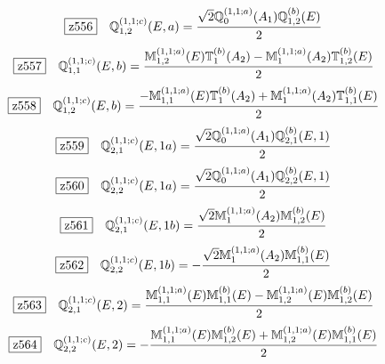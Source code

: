\documentclass[fleqn,10pt,landscape]{jsarticle}
\begin{document}
\begin{dmath*}
\hspace*{3mm}\fbox{z556}\quad \mathbb{Q}_{1,2}^{(1,1;c)}(E,a)=\frac{\sqrt{2} \mathbb{Q}_{0}^{(1,1;a)}(A_{1}) \mathbb{Q}_{1,2}^{(b)}(E)}{2}
\end{dmath*}
\begin{dmath*}
\hspace*{3mm}\fbox{z557}\quad \mathbb{Q}_{1,1}^{(1,1;c)}(E,b)=\frac{\mathbb{M}_{1,2}^{(1,1;a)}(E) \mathbb{T}_{1}^{(b)}(A_{2}) - \mathbb{M}_{1}^{(1,1;a)}(A_{2}) \mathbb{T}_{1,2}^{(b)}(E)}{2}
\end{dmath*}
\begin{dmath*}
\hspace*{3mm}\fbox{z558}\quad \mathbb{Q}_{1,2}^{(1,1;c)}(E,b)=\frac{- \mathbb{M}_{1,1}^{(1,1;a)}(E) \mathbb{T}_{1}^{(b)}(A_{2}) + \mathbb{M}_{1}^{(1,1;a)}(A_{2}) \mathbb{T}_{1,1}^{(b)}(E)}{2}
\end{dmath*}
\begin{dmath*}
\hspace*{3mm}\fbox{z559}\quad \mathbb{Q}_{2,1}^{(1,1;c)}(E,1a)=\frac{\sqrt{2} \mathbb{Q}_{0}^{(1,1;a)}(A_{1}) \mathbb{Q}_{2,1}^{(b)}(E,1)}{2}
\end{dmath*}
\begin{dmath*}
\hspace*{3mm}\fbox{z560}\quad \mathbb{Q}_{2,2}^{(1,1;c)}(E,1a)=\frac{\sqrt{2} \mathbb{Q}_{0}^{(1,1;a)}(A_{1}) \mathbb{Q}_{2,2}^{(b)}(E,1)}{2}
\end{dmath*}
\begin{dmath*}
\hspace*{3mm}\fbox{z561}\quad \mathbb{Q}_{2,1}^{(1,1;c)}(E,1b)=\frac{\sqrt{2} \mathbb{M}_{1}^{(1,1;a)}(A_{2}) \mathbb{M}_{1,2}^{(b)}(E)}{2}
\end{dmath*}
\begin{dmath*}
\hspace*{3mm}\fbox{z562}\quad \mathbb{Q}_{2,2}^{(1,1;c)}(E,1b)=- \frac{\sqrt{2} \mathbb{M}_{1}^{(1,1;a)}(A_{2}) \mathbb{M}_{1,1}^{(b)}(E)}{2}
\end{dmath*}
\begin{dmath*}
\hspace*{3mm}\fbox{z563}\quad \mathbb{Q}_{2,1}^{(1,1;c)}(E,2)=\frac{\mathbb{M}_{1,1}^{(1,1;a)}(E) \mathbb{M}_{1,1}^{(b)}(E) - \mathbb{M}_{1,2}^{(1,1;a)}(E) \mathbb{M}_{1,2}^{(b)}(E)}{2}
\end{dmath*}
\begin{dmath*}
\hspace*{3mm}\fbox{z564}\quad \mathbb{Q}_{2,2}^{(1,1;c)}(E,2)=- \frac{\mathbb{M}_{1,1}^{(1,1;a)}(E) \mathbb{M}_{1,2}^{(b)}(E) + \mathbb{M}_{1,2}^{(1,1;a)}(E) \mathbb{M}_{1,1}^{(b)}(E)}{2}
\end{dmath*}
\end{document}
